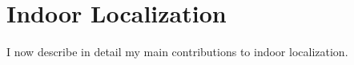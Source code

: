 \documentclass[10pt]{article}
\begin{document}



\section{Indoor Localization}
I now describe in detail my main contributions to indoor localization. \\

\end{document}

